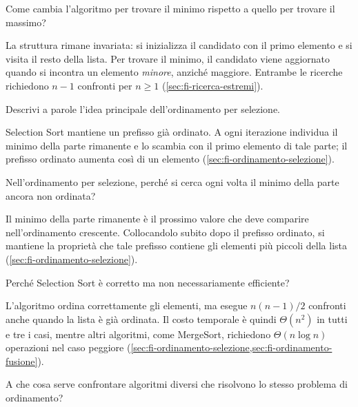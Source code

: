 \begin{exercise}
\label{ex:fi-esercizi-ricerca-ordinamento-minimo}
Come cambia l'algoritmo per trovare il minimo rispetto
a quello per trovare il massimo?
\end{exercise}

La struttura rimane invariata: si inizializza il candidato
con il primo elemento e si visita il resto della lista.
Per trovare il minimo, il candidato viene aggiornato quando
si incontra un elemento \emph{minore}, anziché maggiore.
Entrambe le ricerche richiedono \(n-1\) confronti per \(n\ge1\)
(\cref{sec:fi-ricerca-estremi}).

\begin{exercise}
\label{ex:fi-esercizi-ricerca-ordinamento-selezione-idea}
Descrivi a parole l'idea principale dell'ordinamento
per selezione.
\end{exercise}

Selection Sort mantiene un prefisso già ordinato.
A ogni iterazione individua il minimo della parte rimanente
e lo scambia con il primo elemento di tale parte; il prefisso
ordinato aumenta così di un elemento
(\cref{sec:fi-ordinamento-selezione}).

\begin{exercise}
\label{ex:fi-esercizi-ricerca-ordinamento-selezione-minimo}
Nell'ordinamento per selezione, perché si cerca ogni volta
il minimo della parte ancora non ordinata?
\end{exercise}

Il minimo della parte rimanente è il prossimo valore che deve
comparire nell'ordinamento crescente. Collocandolo subito dopo
il prefisso ordinato, si mantiene la proprietà che tale prefisso
contiene gli elementi più piccoli della lista
(\cref{sec:fi-ordinamento-selezione}).

\begin{exercise}
\label{ex:fi-esercizi-ricerca-ordinamento-selezione-efficienza}
Perché Selection Sort è corretto ma non necessariamente
efficiente?
\end{exercise}

L'algoritmo ordina correttamente gli elementi, ma esegue
\(n(n-1)/2\) confronti anche quando la lista è già ordinata.
Il costo temporale è quindi \(\Theta(n^2)\) in tutti e tre i casi,
mentre altri algoritmi, come MergeSort, richiedono
\(\Theta(n\log n)\) operazioni nel caso peggiore
(\cref{sec:fi-ordinamento-selezione,sec:fi-ordinamento-fusione}).

\begin{exercise}
\label{ex:fi-esercizi-ricerca-ordinamento-confronto-algoritmi}
A che cosa serve confrontare algoritmi diversi che risolvono
lo stesso problema di ordinamento?
\end{exercise}

